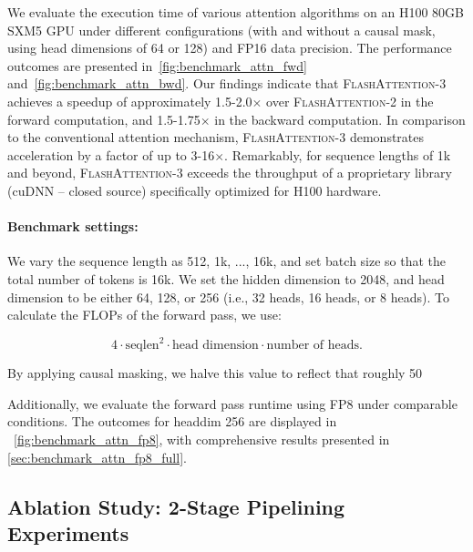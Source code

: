 \begin{enumerate}
\begin{itemize}
We evaluate the execution time of various attention algorithms on an H100 80GB SXM5 GPU under different configurations (with and without a causal mask, using head dimensions of 64 or 128) and FP16 data precision. The performance outcomes are presented in~\cref{fig:benchmark_attn_fwd} and~\cref{fig:benchmark_attn_bwd}. Our findings indicate that \textsc{FlashAttention-3} achieves a speedup of approximately 1.5-2.0$\times$ over \textsc{FlashAttention-2} in the forward computation, and 1.5-1.75$\times$ in the backward computation. In comparison to the conventional attention mechanism, \textsc{FlashAttention-3} demonstrates acceleration by a factor of up to 3-16$\times$. Remarkably, for sequence lengths of 1k and beyond, \textsc{FlashAttention-3} exceeds the throughput of a proprietary library (cuDNN -- closed source) specifically optimized for H100 hardware.

\paragraph{Benchmark settings:} We vary the sequence length as 512, 1k, ..., 16k, and set batch size so that the total number of tokens is 16k. We set the hidden dimension to 2048, and head dimension to be either 64, 128, or 256 (i.e., 32 heads, 16 heads, or 8 heads). To calculate the FLOPs of the forward pass, we use:

\begin{equation*}
  4 \cdot \text{seqlen}^2 \cdot \text{head dimension} \cdot \text{number of heads}.
\end{equation*}

By applying causal masking, we halve this value to reflect that roughly 50%

Additionally, we evaluate the forward pass runtime using FP8 under comparable conditions. The outcomes for headdim 256 are displayed in ~\cref{fig:benchmark_attn_fp8}, with comprehensive results presented in \cref{sec:benchmark_attn_fp8_full}.

\subsection{Ablation Study: 2-Stage Pipelining Experiments}
\label{sec:2-stage-pipelining-experiments}


\end{itemize}
\end{enumerate}
